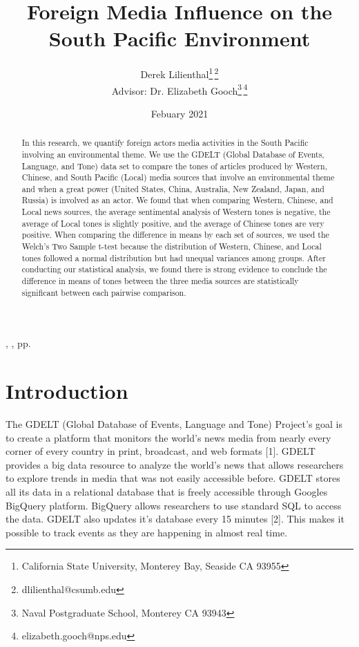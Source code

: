 \documentclass[12pt]{article}
\title{Foreign Media Influence on the South Pacific Environment}
\author{
Derek Lilienthal\thanks{California State University, Monterey Bay, Seaside CA 93955}\;\,\thanks{dlilienthal@csumb.edu}\\{\small Advisor: Dr. Elizabeth Gooch\thanks{Naval Postgraduate School, Monterey CA 93943}\;\,\thanks{elizabeth.gooch@nps.edu}}}
\date{\small Febuary 2021} %
\begin{document}

\begin{htmlonly}
\href{\jref}{\jhead}, \jdate, pp.\
\end{htmlonly}

\maketitle

\begin{abstract}

In this research, we quantify foreign actors media activities in the South Pacific involving an environmental theme. We use the GDELT (Global Database of Events, Language, and Tone) data set to compare the tones of articles produced by Western, Chinese, and South Pacific (Local) media sources that involve an environmental theme and when a great power (United States, China, Australia, New Zealand, Japan, and Russia) is involved as an actor. We found that when comparing Western, Chinese, and Local news sources, the average sentimental analysis of Western tones is negative, the average of Local tones is slightly positive, and the average of Chinese tones are very positive. When comparing the difference in means by each set of sources, we used the Welch’s Two Sample t-test because the distribution of Western, Chinese, and Local tones followed a normal distribution but had unequal variances among groups. After conducting our statistical analysis, we found there is strong evidence to conclude the difference in means of tones between the three media sources are statistically significant between each pairwise comparison. 
\end{abstract}





\setlength{\baselineskip}{16pt plus.2pt}

\section*{Introduction}
The GDELT (Global Database of Events, Language and Tone) Project's goal is to create a platform that monitors the world’s news media from nearly every corner of every country in print, broadcast, and web formats [1]. GDELT provides a big data resource to analyze the world's news that allows researchers to explore trends in media that was not easily accessible before. GDELT stores all its data in a relational database that is freely accessible through Googles BigQuery platform. BigQuery allows researchers to use standard SQL to access the data. GDELT also updates it's database every 15 minutes [2]. This makes it possible to track events as they are happening in almost real time.
\end{document}
